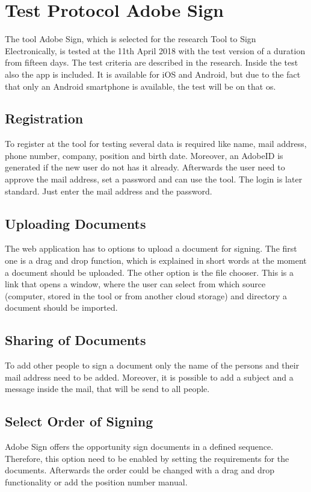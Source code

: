 \section{Test Protocol Adobe Sign}
\label{sec:adobesign}
The tool Adobe Sign, which is selected for the research Tool to Sign Electronically, is tested at the 11th April 2018 with the test version of a duration from fifteen days. The test criteria are described in the research. Inside the test also the \gls{app} is included. It is available for iOS and Android, but due to the fact that only an Android smartphone is available, the test will be on that \gls{os}.

\subsection{Registration}
To register at the tool for testing several data is required like name, mail address, phone number, company, position and birth date. Moreover, an AdobeID is generated if the new user do not has it already. Afterwards the user need to approve the mail address, set a password and can use the tool. The login is later standard. Just enter the mail address and the password.

\subsection{Uploading Documents}
The web application has to options to upload a document for signing. The first one is a drag and drop function, which is explained in short words at the moment a document should be uploaded. The other option is the file chooser. This is a link that opens a window, where the user can select from which source (computer, stored in the tool or from another cloud storage) and directory a document should be imported.

\subsection{Sharing of Documents}
To add other people to sign a document only the name of the persons and their mail address need to be added. Moreover, it is possible to add a subject and a message inside the mail, that will be send to all people.

\subsection{Select Order of Signing}
Adobe Sign offers the opportunity sign documents in a defined sequence. Therefore, this option need to be enabled by setting the requirements for the documents. Afterwards the order could be changed with a drag and drop functionality or add the position number manual.

